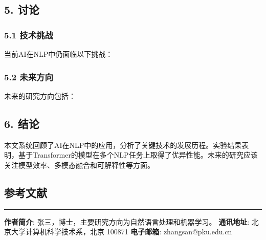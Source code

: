 \documentclass[UTF8, a4paper, 11pt]{ctexart}
\begin{document}
\subsection{5. 讨论}


\subsubsection{5.1 技术挑战}


当前AI在NLP中仍面临以下挑战：

\subsubsection{5.2 未来方向}


未来的研究方向包括：

\subsection{6. 结论}


本文系统回顾了AI在NLP中的应用，分析了关键技术的发展历程。实验结果表明，基于Transformer的模型在多个NLP任务上取得了优异性能。未来的研究应该关注模型效率、多模态融合和可解释性等方面。


\subsection{参考文献}

\noindent\rule{\textwidth}{1pt}

\textbf{作者简介}: 张三，博士，主要研究方向为自然语言处理和机器学习。 \textbf{通讯地址}: 北京大学计算机科学技术系，北京 100871 \textbf{电子邮箱}: zhangsan@pku.edu.cn
\end{document}
